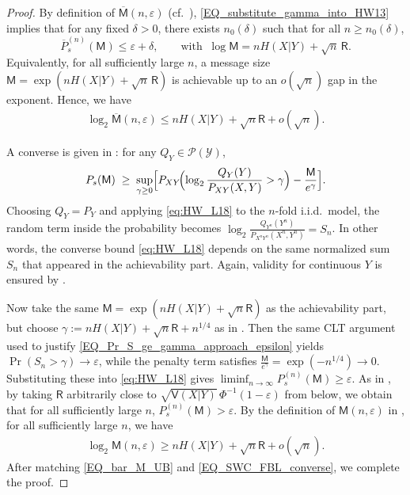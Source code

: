 \documentclass[onecolumn]{IEEEtran} %
\newcommand{\1}{\mathbbm{1}}
\theoremstyle{boldremark}
\begin{document}
\begin{proof}
By definition of $\overline{\textsf{M}}(n,\varepsilon)$ (cf.\ \cite[Eqs.~(109)--(116)]{Hayashi_SWC_Entropy20}),
\eqref{EQ_substitute_gamma_into_HW13} implies that for any fixed $\delta>0$, there exists $n_0(\delta)$ such that
for all $n\ge n_0(\delta)$,
\[
  \overline{P}_s^{(n)}(\textsf{M}) \le \varepsilon+\delta,
  \qquad
  \text{with }\ \log \textsf{M}=nH(X|Y)+\sqrt{n}\,\textsf{R}.
\]
Equivalently, for all sufficiently large $n$, a message size $\textsf{M}=\exp(nH(X|Y)+\sqrt{n}\,\textsf{R})$ is achievable up to an $o(\sqrt{n})$ gap in the exponent. Hence, we have
\begin{align}\label{EQ_bar_M_UB}
  \log_2 \overline{\textsf{M}}(n,\varepsilon)  \le   nH(X|Y)+\sqrt{n}\textsf{R} + o(\sqrt{n}).
\end{align}



A converse is given in \cite[Lemma~18]{Hayashi_SWC_Entropy20}: for any $Q_Y\in\mathcal{P}(\mathcal{Y})$,
\begin{align}
  P_s(\textsf{M})
  \;\ge\;
  \sup_{\gamma\ge 0}\Bigl[
    P_{XY}\!\Bigl(\log_2\frac{Q_Y(Y)}{P_{XY}(X,Y)} > \gamma\Bigr)
    - \frac{\textsf{M}}{e^\gamma}
  \Bigr].
  \label{eq:HW_L18}
\end{align}
Choosing $Q_Y=P_Y$ and applying \eqref{eq:HW_L18} to the $n$-fold i.i.d.\ model, the random term inside the probability becomes
$  \log_2\frac{Q_{Y^n}(Y^n)}{P_{X^nY^n}(X^n,Y^n)}  = S_n$. In other words, the converse bound
\eqref{eq:HW_L18} depends on the same normalized sum $S_n$ that appeared in the achievability part.
Again, validity for continuous $Y$ is ensured by \cite[Remark~1]{Hayashi_SWC_Entropy20}.

Now take the same $\textsf{M}=\exp(nH(X|Y)+\sqrt{n}\textsf{R})$ as the achievability part, but choose
$\gamma := nH(X|Y)+\sqrt{n}\textsf{R} + n^{1/4}$ as in \cite[Proof of Theorem~11]{Hayashi_SWC_Entropy20}.
Then the same CLT argument used to justify \eqref{EQ_Pr_S_ge_gamma_approach_epsilon} yields $\Pr(S_n>\gamma)\to\varepsilon$, while the penalty term satisfies $ \frac{\textsf{M}}{e^\gamma}=\exp(-n^{1/4})\to 0.$
Substituting these into \eqref{eq:HW_L18} gives $\liminf_{n\to\infty} P_s^{(n)}(\textsf{M})\ge \varepsilon$.
As in \cite[Proof of Theorem~11]{Hayashi_SWC_Entropy20}, by taking $\textsf{R}$ arbitrarily close to $\sqrt{\textsf{V}(X|Y)}\,\Phi^{-1}(1-\varepsilon)$ from below, we obtain that
for all sufficiently large $n$, $P_s^{(n)}(\textsf{M})>\varepsilon$. By the definition of $\textsf{M}(n,\varepsilon)$ in
\cite[Eqs.~(115)--(116)]{Hayashi_SWC_Entropy20}, for all sufficiently large $n$, we have
\begin{align}\label{EQ_SWC_FBL_converse}
  \log_2 \textsf{M}(n,\varepsilon) \ge nH(X|Y)+\sqrt{n}\textsf{R} + o(\sqrt{n}).
\end{align}
  After matching \eqref{EQ_bar_M_UB} and \eqref{EQ_SWC_FBL_converse}, we complete the proof.
\end{proof}



%

% 







% 
\end{document}
